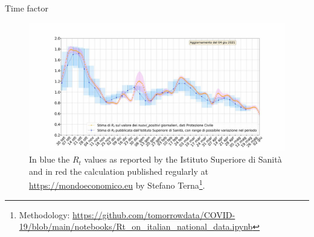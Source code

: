 \documentclass[9pt]{beamer}
\begin{document}
\begin{frame}{Time factor}

\begin{figure}[H]
\center
\includegraphics[scale=0.21]{RtEstimation3.jpg}
\caption{In blue the $R_t$ values as reported by the Istituto Superiore di Sanit\`{a} and in red the calculation published regularly at \url{https://mondoeconomico.eu} by Stefano Terna\footnote{Methodology: \url{https://github.com/tomorrowdata/COVID-19/blob/main/notebooks/Rt_on_italian_national_data.ipynb}}.}
\label{Rt}
\end{figure}


\end{frame}
\end{document}
